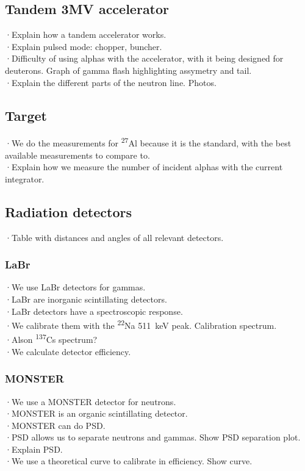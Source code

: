 \documentclass[a4paper,12pt]{report}
\newcommand{\Aliso}{\textsuperscript{27}Al }
\newcommand{\Na}{\textsuperscript{22}Na }
\begin{document}
\subsection{Tandem 3MV accelerator}
·Explain how a tandem accelerator works.\\
·Explain pulsed mode: chopper, buncher.\\
·Difficulty of using alphas with the accelerator, with it being designed for deuterons. Graph of gamma flash highlighting assymetry and tail.\\

·Explain the different parts of the neutron line. Photos.\\

\subsection{Target}
·We do the measurements for \Aliso because it is the standard, with the best available measurements to compare to.\\
·Explain how we measure the number of incident alphas with the current integrator.\\

\subsection{Radiation detectors}
·Table with distances and angles of all relevant detectors.\\

\subsubsection{LaBr}
·We use LaBr detectors for gammas.\\
·LaBr are inorganic scintillating detectors.\\
·LaBr detectors have a spectroscopic response.\\

·We calibrate them with the \Na \qty{511}{\keV} peak. Calibration spectrum.\\
·Alson \textsuperscript{137}Cs spectrum?\\
·We calculate detector efficiency.\\

\subsubsection{MONSTER}
·We use a MONSTER detector for neutrons.\\
·MONSTER is an organic scintillating detector.\\
·MONSTER can do PSD.\\
·PSD allows us to separate neutrons and gammas. Show PSD separation plot.\\
·Explain PSD.\\
·We use a theoretical curve to calibrate in efficiency. Show curve.\\
\end{document}
